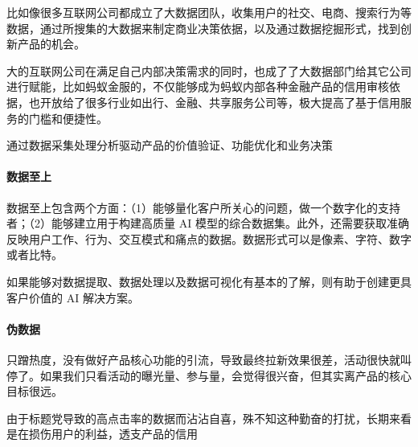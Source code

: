 \documentclass[letterpaper,10pt,english]{sphinxmanual}
\begin{document}
比如像很多互联网公司都成立了大数据团队，收集用户的社交、电商、搜索行为等数据，通过所搜集的大数据来制定商业决策依据，以及通过数据挖掘形式，找到创新产品的机会。

大的互联网公司在满足自己内部决策需求的同时，也成了了大数据部门给其它公司进行赋能，比如蚂蚁金服的，不仅能够成为蚂蚁内部各种金融产品的信用审核依据，也开放给了很多行业如出行、金融、共享服务公司等，极大提高了基于信用服务的门槛和便捷性。

通过数据采集处理分析驱动产品的价值验证、功能优化和业务决策


\paragraph{数据至上}
\label{\detokenize{chapter_idea/data:id3}}
数据至上包含两个方面：（1）能够量化客户所关心的问题，做一个数字化的支持者；（2）能够建立用于构建高质量
AI
模型的综合数据集。此外，还需要获取准确反映用户工作、行为、交互模式和痛点的数据。数据形式可以是像素、字符、数字或者比特。

如果能够对数据提取、数据处理以及数据可视化有基本的了解，则有助于创建更具客户价值的
AI 解决方案。%
\begin{footnote}[375]\sphinxAtStartFootnote
{}
%
\end{footnote}

%
\begin{footnote}[376]\sphinxAtStartFootnote
{}
%
\end{footnote}


\paragraph{伪数据}
\label{\detokenize{chapter_idea/data:id4}}
只蹭热度，没有做好产品核心功能的引流，导致最终拉新效果很差，活动很快就叫停了。如果我们只看活动的曝光量、参与量，会觉得很兴奋，但其实离产品的核心目标很远。

由于标题党导致的高点击率的数据而沾沾自喜，殊不知这种勤奋的打扰，长期来看是在损伤用户的利益，透支产品的信用%
\begin{footnote}[377]\sphinxAtStartFootnote
{}
%
\end{footnote}
\end{document}
